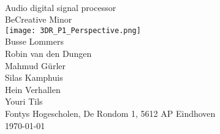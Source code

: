 \pagestyle{empty}
\centering
\fontsize{2cm}{2cm}\selectfont{Module Design Document} \\
\vspace{2mm}
\fontsize{1cm}{1cm}\selectfont Audio digital signal processor \\
\vspace{2mm}
\large BeCreative Minor\\
\normalsize
\vspace{4cm}
\texttt{[image: 3DR\_P1\_Perspective.png]}\\
\vfill
\normalsize Busse Lommers \\
Robin van den Dungen \\
Mahmud Gürler \\
Silas Kamphuis \\
Hein Verhallen \\
Youri Tils \\
Fontys Hogescholen, De Rondom 1, 5612 AP Eindhoven \\
\today

